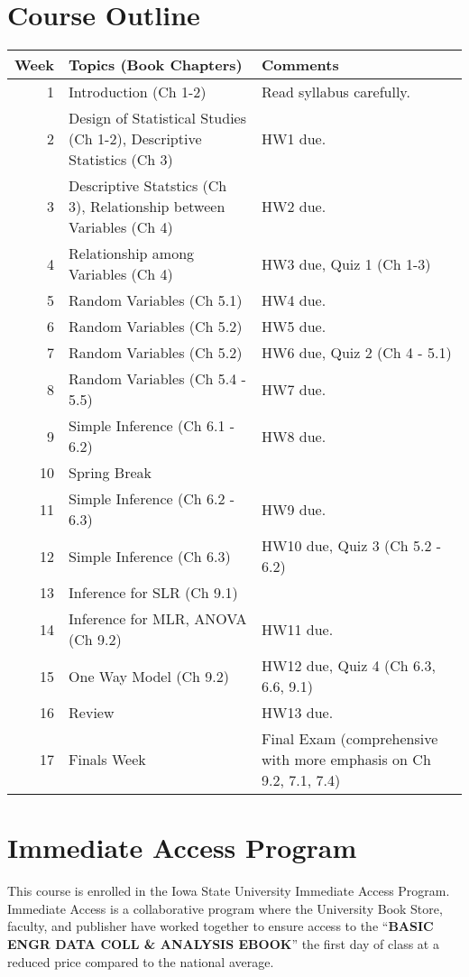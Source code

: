 \documentclass{article}
\begin{document}
	\section{Course Outline}
	\begin{center}
		\begin{tabular}{r|lp{}}
			\toprule
			Week & Topics (Book Chapters) & Comments\\
			\midrule
			1 & Introduction (Ch 1-2) & Read syllabus carefully.\\
		2 & Design of Statistical Studies (Ch 1-2), Descriptive
		Statistics (Ch 3) & HW1 due.\\
		3 & Descriptive Statstics (Ch 3), Relationship between Variables
		(Ch 4) & HW2 due.\\
		4 & Relationship among Variables (Ch 4) & HW3 due, Quiz 1 (Ch
		1-3)\\
		5 & Random Variables (Ch 5.1) & HW4 due.\\
		6 & Random Variables (Ch 5.2) & HW5 due.\\
		7 & Random Variables (Ch 5.2) & HW6 due, Quiz 2 (Ch 4 - 5.1)\\
		8 & Random Variables (Ch 5.4 - 5.5) & HW7 due.\\
		9 & Simple Inference (Ch 6.1 - 6.2) & HW8 due. \\
		10 & Spring Break & \\
		11 & Simple Inference (Ch 6.2 - 6.3) & HW9 due.\\
		12 & Simple Inference (Ch 6.3) & HW10 due, Quiz 3 (Ch 5.2 -
		6.2)\\
		13 & Inference for SLR (Ch 9.1) & \\
		14 & Inference for MLR, ANOVA (Ch 9.2) & HW11 due.\\
		15 & One Way Model (Ch 9.2) & HW12 due, Quiz 4 (Ch 6.3, 6.6,
		9.1)\\
		16 & Review & HW13 due.\\
		17 & Finals Week & Final Exam (comprehensive with more emphasis
		on Ch 9.2, 7.1, 7.4)\\
		\bottomrule
		
		\end{tabular}
	\end{center}
	\section{Immediate Access Program}\label{ebook}
This course is enrolled in the Iowa State University Immediate Access Program.
Immediate Access is a collaborative program where the University Book Store,
faculty, and publisher have worked together to ensure access to the
“{\bf BASIC ENGR
DATA COLL \& ANALYSIS EBOOK}” the first day of class at a reduced price compared to the national average. 
 
\end{document}
